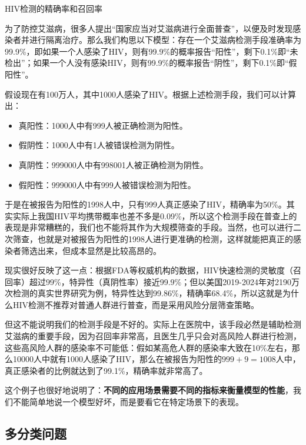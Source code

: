 \begin{example}{HIV检测的精确率和召回率}{}

    为了防控艾滋病，很多人提出“国家应当对艾滋病进行全面普查”，以便及时发现感染者并进行隔离治疗。那么我们构思以下模型：存在一个艾滋病检测手段准确率为99.9\%，即如果一个人感染了HIV，则有99.9\%的概率报告“阳性”，剩下0.1\%即“未检出”；如果一个人没有感染HIV，则有99.9\%的概率报告“阴性”，剩下0.1\%即“假阳性”。

    假设现在有100万人，其中1000人感染了HIV。根据上述检测手段，我们可以计算出：
    \begin{itemize}
        \item 真阳性：1000人中有999人被正确检测为阳性。
        \item 假阴性：1000人中有1人被错误检测为阴性。
        \item 真阴性：999000人中有998001人被正确检测为阴性。
        \item 假阳性：999000人中有999人被错误检测为阳性。
    \end{itemize}
    于是在被报告为阳性的1998人中，只有999人真正感染了HIV，精确率为50\%。其实实际上我国HIV平均携带概率也差不多是0.09\%，所以这个检测手段在普查上的表现是非常糟糕的，我们也不能将其作为大规模筛查的手段。当然，也可以进行二次筛查，也就是对被报告为阳性的1998人进行更准确的检测，这样就能把真正的感染者筛选出来，但成本显然是比较高昂的。

    现实很好反映了这一点：根据FDA等权威机构的数据，HIV快速检测的灵敏度（召回率）超过99\%，特异性（真阴性率）接近99.9\%；但以美国2019-2024年对2190万次检测的真实世界研究为例，特异性达到99.86\%，精确率68.4\%\cite{zhu-real-world-2026}，所以这就是为什么HIV检测不推荐对普通人群进行普查，而是采用风险分层筛查策略。

    但这不能说明我们的检测手段是不好的。实际上在医院中，该手段必然是辅助检测艾滋病的重要手段，因为召回率非常高，且医生几乎只会对高风险人群进行检测，这些高风险人群的感染率不可能低：假如某高危人群的感染率大致在10\%左右，那么10000人中就有1000人感染了HIV，那么在被报告为阳性的$999+9 = 1008$人中，真正感染者的比例就达到了99.1\%，精确率就非常高了。
\end{example}

这个例子也很好地说明了：\textbf{不同的应用场景需要不同的指标来衡量模型的性能}，我们不能简单地说一个模型好坏，而是要看它在特定场景下的表现。

\subsection{多分类问题}


